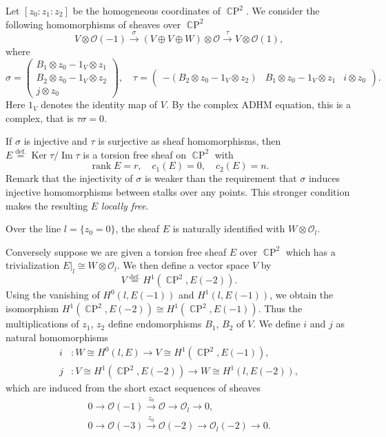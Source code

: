 \documentclass[12pt]{amsart}
\newcommand{\cal}{\mathcal}
\theoremstyle{definition}
\theoremstyle{remark}
\numberwithin{equation}{section}
\newcommand{\defeq}{\overset{\operatorname{\scriptstyle def.}}{=}}
\newcommand{\C}{{\mathbb C}}
\newcommand{\CP}{\operatorname{\C P}}
\newcommand{\Ker}{\operatorname{Ker}}
\newcommand{\Ima}{\operatorname{Im}}
\newcommand{\rank}{\operatorname{rank}}
\newcommand{\shfO}{\cal O} %
\begin{document}
Let $[z_0 : z_1 : z_2]$ be the homogeneous coordinates of $\CP^2$.
We consider the following homomorphisms of sheaves over $\CP^2$
\begin{equation*}
  V\otimes\shfO(-1) 
  \xrightarrow{\sigma} 
  (V\oplus V \oplus W)\otimes\shfO
  \xrightarrow{\tau}
  V\otimes\shfO(1),
\end{equation*}
where
\begin{equation*}
  \sigma = \begin{pmatrix} B_1\otimes z_0 - 1_V\otimes z_1 \\
  B_2\otimes z_0 - 1_V\otimes z_2 \\ j\otimes z_0\end{pmatrix},
  \quad \tau = \begin{pmatrix}
  - (B_2\otimes z_0 - 1_V\otimes z_2) &
  B_1\otimes z_0 - 1_V\otimes z_1 & i\otimes z_0\end{pmatrix}.
\end{equation*}
Here $1_V$ denotes the identity map of $V$.
By the complex ADHM equation, this is a complex, that is
$\tau\sigma = 0$.

If $\sigma$ is injective and $\tau$ is surjective as sheaf
homomorphisms, then $E \defeq \Ker\tau / \Ima\tau$ is a torsion free sheaf on
$\CP^2$ with
\begin{equation*}
  \rank E = r, \quad c_1(E) = 0, \quad c_2(E) = n.
\end{equation*}
Remark that the injectivity of $\sigma$ is weaker than the requirement
that $\sigma$ induces injective homomorphisms between stalks over any
points.
This stronger condition makes the resulting $E$ {\it locally free\/}.

Over the line $l = \{z_0 = 0\}$, the sheaf $E$ is naturally identified
with $W\otimes\shfO_l$.

Conversely suppose we are given a torsion free sheaf $E$ over $\CP^2$
which has a trivialization $E|_l \cong W\otimes\shfO_l$.
We then define a vector space $V$ by
\begin{equation*}
  V \defeq H^1(\CP^2, E(-2)).
\end{equation*}
Using the vanishing of $H^0(l, E(-1))$ and $H^1(l, E(-1))$, we obtain
the isomorphism $H^1(\CP^2, E(-2))\cong H^1(\CP^2, E(-1))$. Thus the
multiplications of $z_1$, $z_2$ define endomorphisms $B_1$, $B_2$ of
$V$. We define $i$ and $j$ as natural homomorphisms
\begin{equation*}\begin{split}
  i &\colon W\cong H^0(l, E) \to V\cong H^1(\CP^2, E(-1)), \\
  j &\colon V\cong H^1(\CP^2, E(-2)) \to W\cong H^1(l, E(-2)),
\end{split}\end{equation*}
which are induced from the short exact sequences of sheaves
\begin{gather*}
  0 \to \shfO(-1) \xrightarrow{z_0} \shfO \to \shfO_l \to 0, \\
  0 \to \shfO(-3) \xrightarrow{z_0} \shfO(-2) \to \shfO_l(-2) \to 0.
\end{gather*}
\end{document}
